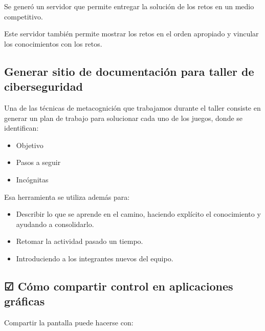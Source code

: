 \documentclass[
  12,
]{scrartcl}
\providecommand{\tightlist}{%
  \setlength{\itemsep}{0pt}\setlength{\parskip}{0pt}}
\begin{document}
Se generó un servidor que permite entregar la solución de los retos en
un medio competitivo.

Este servidor también permite mostrar los retos en el orden apropiado y
vincular los conocimientos con los retos.

\hypertarget{generar-sitio-de-documentaciuxf3n-para-taller-de-ciberseguridad}{%
\subsection{Generar sitio de documentación para taller de
ciberseguridad}\label{generar-sitio-de-documentaciuxf3n-para-taller-de-ciberseguridad}}

Una de las técnicas de metacognición que trabajamos durante el taller
consiste en generar un plan de trabajo para solucionar cada uno de los
juegos, donde se identifican:

\begin{itemize}
\tightlist
\item
  Objetivo
\item
  Pasos a seguir
\item
  Incógnitas
\end{itemize}

Esa herramienta se utiliza además para:

\begin{itemize}
\item
  Describir lo que se aprende en el camino, haciendo explícito el
  conocimiento y ayudando a consolidarlo.
\item
  Retomar la actividad pasado un tiempo.
\item
  Introduciendo a los integrantes nuevos del equipo.
\end{itemize}

\hypertarget{cuxf3mo-compartir-control-en-aplicaciones-gruxe1ficas}{%
\subsection{☑ Cómo compartir control en aplicaciones
gráficas}\label{cuxf3mo-compartir-control-en-aplicaciones-gruxe1ficas}}

Compartir la pantalla puede hacerse con:
\end{document}
